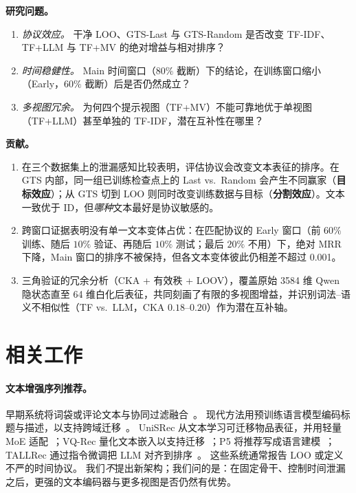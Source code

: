 \documentclass[sigconf,natbib=true,anonymous]{acmart}
\newcommand{\tfidf}{\textsc{TF-IDF}\xspace}
\newcommand{\tfllm}{\textsc{TF+LLM}\xspace}
\newcommand{\tfmv}{\textsc{TF+MV}\xspace}
\begin{document}
\smallskip\noindent\textbf{研究问题。}
\begin{enumerate}[leftmargin=*,itemsep=1pt]
\item[\textbf{RQ1}] \emph{协议效应。}
干净 LOO、GTS-Last 与 GTS-Random 是否改变 \tfidf、\tfllm 与 \tfmv 的绝对增益与相对排序？
\item[\textbf{RQ2}] \emph{时间稳健性。}
Main 时间窗口（$80\%$ 截断）下的结论，在训练窗口缩小（Early，$60\%$ 截断）后是否仍然成立？
\item[\textbf{RQ3}] \emph{多视图冗余。}
为何四个提示视图（\tfmv）不能可靠地优于单视图（\tfllm）甚至单独的 \tfidf，潜在互补性在哪里？
\end{enumerate}

\smallskip\noindent\textbf{贡献。}
\begin{enumerate}[leftmargin=*,itemsep=1pt]
\item 在三个数据集上的泄漏感知比较表明，评估协议会改变文本表征的排序。在 GTS 内部，同一组已训练检查点上的 Last vs.\ Random 会产生不同赢家（\textbf{目标效应}）；从 GTS 切到 LOO 则同时改变训练数据与目标（\textbf{分割效应}）。文本一致优于 ID，但\emph{哪种}文本最好是协议敏感的。
\item 跨窗口证据表明没有单一文本变体占优：在匹配协议的 Early 窗口（前 $60\%$ 训练、随后 $10\%$ 验证、再随后 $10\%$ 测试；最后 $20\%$ 不用）下，绝对 MRR 下降，Main 窗口的排序不被保持，但各文本变体彼此仍相差不超过 0.001。
\item 三角验证的冗余分析（CKA + 有效秩 + LOOV），覆盖原始 3584 维 Qwen 隐状态直至 64 维白化后表征，共同刻画了有限的多视图增益，并识别词法--语义不相似性（TF vs.\ LLM，CKA $0.18$--$0.20$）作为潜在互补轴。
\end{enumerate}

\section{相关工作}
\label{sec:related}

\paragraph{文本增强序列推荐。}
早期系统将词袋或评论文本与协同过滤融合~\cite{wang2015cdl,salton1988termweighting}。
现代方法用预训练语言模型编码标题与描述，以支持跨域迁移~\cite{hou2022unisrec,hou2023vqrec,geng2022p5,bao2023tallrec}。
UniSRec 从文本学习可迁移物品表征，并用轻量 MoE 适配~\cite{hou2022unisrec}；VQ-Rec 量化文本嵌入以支持迁移~\cite{hou2023vqrec}；P5 将推荐写成语言建模~\cite{geng2022p5}；TALLRec 通过指令微调把 LLM 对齐到排序~\cite{bao2023tallrec}。
这些系统通常报告 LOO 或定义不严的时间协议。
我们\emph{不}提出新架构；我们问的是：在固定骨干、控制时间泄漏之后，更强的文本编码器与更多视图是否仍然有优势。
\end{document}
